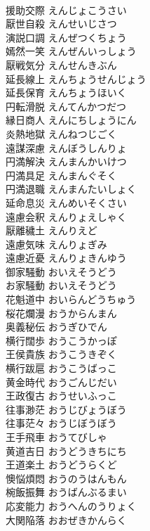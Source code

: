 \documentclass[8pt]{extreport}
\begin{document}
\begin{CJK}{UTF8}{min}
\\	援助交際	えんじょこうさい	
\\	厭世自殺	えんせいじさつ	
\\	演説口調	えんぜつくちょう	
\\	嫣然一笑	えんぜんいっしょう	
\\	厭戦気分	えんせんきぶん	
\\	延長線上	えんちょうせんじょう	
\\	延長保育	えんちょうほいく	
\\	円転滑脱	えんてんかつだつ	
\\	縁日商人	えんにちしょうにん	
\\	炎熱地獄	えんねつじごく	
\\	遠謀深慮	えんぼうしんりょ	
\\	円満解決	えんまんかいけつ	
\\	円満具足	えんまんぐそく	
\\	円満退職	えんまんたいしょく	
\\	延命息災	えんめいそくさい	
\\	遠慮会釈	えんりょえしゃく	
\\	厭離穢土	えんりえど	
\\	遠慮気味	えんりょぎみ	
\\	遠慮近憂	えんりょきんゆう	
\\	御家騒動	おいえそうどう	
\\	お家騒動	おいえそうどう	
\\	花魁道中	おいらんどうちゅう	
\\	桜花爛漫	おうからんまん	
\\	奥義秘伝	おうぎひでん	
\\	横行闊歩	おうこうかっぽ	
\\	王侯貴族	おうこうきぞく	
\\	横行跋扈	おうこうばっこ	
\\	黄金時代	おうごんじだい	
\\	王政復古	おうせいふっこ	
\\	往事渺茫	おうじびょうぼう	
\\	往事茫々	おうじぼうぼう	
\\	王手飛車	おうてびしゃ	
\\	黄道吉日	おうどうきちにち	
\\	王道楽土	おうどうらくど	
\\	懊悩煩悶	おうのうはんもん	
\\	椀飯振舞	おうばんぶるまい	
\\	応変能力	おうへんのうりょく	
\\	大関陥落	おおぜきかんらく	

\end{CJK}
\end{document}
